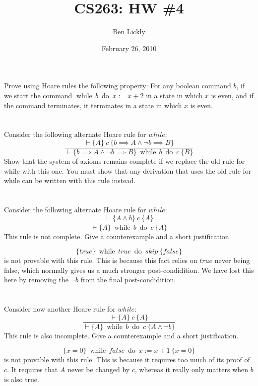 \documentclass{article}
\title{CS263: HW \#4}
\author{Ben Lickly}
\date{February 26, 2010}
\newcommand{\problem}[1]
{\subsubsection*{} %
\vspace{-16pt} \section{} \vspace{-22pt} \qquad
#1%
\bigskip \bigskip
}
\newcommand{\while}[2]{\operatorname{while}\, #1\ \operatorname{do}\ #2}
\newcommand{\proves}{\vdash}
\newcommand{\axiomatic}[3]{\{#1\}\ #2\ \{#3\}}
\begin{document}
\maketitle

\problem{
Prove using Hoare rules the following property: For any boolean
command $b$, if we start the command $\while{b}{x := x + 2}$ in a state in
which $x$ is even, and if the command terminates, it terminates in a state in
which $x$ is even.
}

\problem{Consider the following alternate Hoare rule for $while$:
\[
\frac{\proves \axiomatic{A}{c}{b \implies A \wedge \neg b \implies B}}
{\proves \axiomatic{b \implies A \wedge \neg b \implies B}{\while{b}{c}}{B}}
\]
    Show that the system of axioms remains complete if we replace the old
rule for while with this one. You must show that any derivation that uses
the old rule for while can be written with this rule instead.
}

\problem{Consider the following alternate Hoare rule for $while$:
\[
\frac{\proves \axiomatic{A \wedge b}{c}{A}}
{\proves \axiomatic{A}{\while{b}{c}}{A}}
\]
This rule is not complete. Give a counterexample and a short justification.
}

\[\axiomatic{true}{\while{true}{skip}}{false}\] is not provable with this rule. 
This is because this fact relies on $true$ never being false, which normally
gives us a much stronger post-condidition.  We have lost this here by removing
the $\neg b$ from the final post-condidition.

\problem{Consider now another Hoare rule for $while$:
\[
\frac{\proves \axiomatic{A}{c}{A}}
{\proves \axiomatic{A}{\while{b}{c}}{A \wedge \neg b}}
\]
This rule is also incomplete. Give a counterexample and a short justification.
}

\[\axiomatic{x=0}{\while{false}{x:=x+1}}{x=0}\] is not provable with this rule.
This is because it requires too much of its proof of $c$.  It requires that 
$A$ never be changed by $c$, whereas it really only matters when $b$ is also
true.
\end{document}
